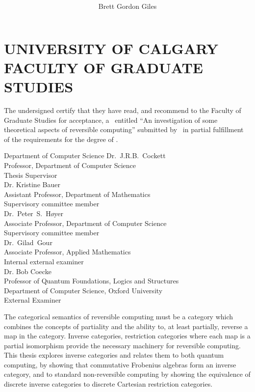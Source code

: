\documentclass{ucalgthes1}
\title{\thesistitle \\
\bigskip  }
\author{Brett Gordon Giles}
\newcommand{\thesistitle}{An investigation of some theoretical aspects of reversible computing}
\begin{document}
\makethesistitle
{}     %
\setcounter{page}{1}
\chapter*{UNIVERSITY OF CALGARY \\ FACULTY OF GRADUATE STUDIES}
\thispagestyle{empty}
The undersigned certify that they have read, and recommend
to the Faculty of Graduate Studies for acceptance, a \Thesis\ entitled
``\thesistitle'' submitted by \Author\
in partial fulfillment of the requirements for the degree of
\Degree.\\
\begin{signing}{Department of Computer Science}
\signline
Dr.~J.R.B.~Cockett\\
Professor, Department of Computer Science \\
Thesis Supervisor\\
\signline
Dr. Kristine Bauer \\
Assistant Professor, Department of Mathematics \\
Supervisory committee member  \\
\signline
Dr.~Peter~S.~Høyer \\
Associate Professor, Department of Computer Science \\
Supervisory committee member  \\
\newsigncolumn
\signline
Dr.~Gilad~Gour \\
Associate Professor, Applied Mathematics\\
Internal external examiner  \\
\signline
Dr. Bob Coecke\\
Professor of Quantum Foundations, Logics and Structures\\
Department of Computer Science,  Oxford University \\
External Examiner
\end{signing}
%
\newpage
{}
{}
The categorical semantics of reversible computing must be a category which combines the concepts of
partiality and the ability to, at least partially, reverse a map in the category. Inverse
categories, restriction categories where each map is a partial isomorphism provide the necessary
machinery for reversible computing. This thesis explores inverse categories and relates them to both
quantum computing, by showing that commutative Frobenius algebras form an inverse category, and to
standard non-reversible computing by showing the equivalence of discrete inverse categories to
discrete Cartesian restriction categories.
\end{document}

